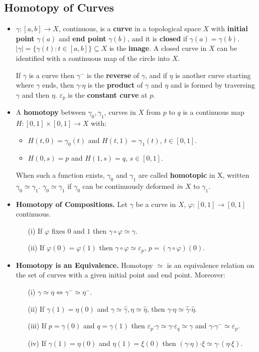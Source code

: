 \documentclass{article}
\newenvironment{topic}[1]{%
{\subsection{#1}}%
\begin{itemize}%
}{%
\end{itemize}%
}
\newcommand{\theorem}[1]{\item {\bf #1.}}
\newcommand{\lemma}[1]{\item {\bf #1.}}
\newcommand{\term}[1]{{\bf #1}}
\newcommand{\remark}{\item}
\newcommand{\curveproduct}{\boldsymbol{\cdot}}
\begin{document}
\begin{topic}{Homotopy of Curves}

\remark $\gamma : [a, b] \to X$, continuous, is a \term{curve} in a topological space $X$ with \term{initial point} $\gamma(a)$ and \term{end point} $\gamma(b)$, and it is \term{closed} if $\gamma(a) = \gamma(b)$. $|\gamma| = \{ \gamma(t) : t \in [a, b] \} \subseteq X$ is the \term{image}. A closed curve in $X$ can be identified with a continuous map of the circle into $X$.

If $\gamma$ is a curve then $\gamma^-$ is the \term{reverse} of $\gamma$, and if $\eta$ is another curve starting where $\gamma$ ends, then $\gamma \curveproduct \eta$ is the \term{product} of $\gamma$ and $\eta$ and is formed by traversing $\gamma$ and then $\eta$. $\varepsilon_p$ is the \term{constant curve} at $p$.

\remark A \term{homotopy} between $\gamma_0, \gamma_1$, curves in $X$ from $p$ to $q$ is a continuous map $H : [0, 1] \times [0, 1] \to X$ with:
\begin{itemize}
\item $H(t, 0) = \gamma_0(t)$ and $H(t, 1) = \gamma_1(t)$, $t \in [0, 1]$.
\item $H(0, s) = p$ and $H(1, s) = q$, $s \in [0, 1]$.
\end{itemize}
When such a function exists, $\gamma_0$ and $\gamma_1$ are called \term{homotopic} in X, written $\gamma_0 \simeq \gamma_1$. $\gamma_0 \simeq \gamma_1$ if $\gamma_0$ can be continuously deformed {\em in $X$} to $\gamma_1$.

\lemma{Homotopy of Compositions} Let $\gamma$ be a curve in $X$, $\varphi : [0, 1] \to [0, 1]$ continuous.
\begin{enumerate}
\item[(i)] If $\varphi$ fixes $0$ and $1$ then $\gamma \circ \varphi \simeq \gamma$.
\item[(ii)] If $\varphi(0) = \varphi(1)$ then $\gamma \circ \varphi \simeq \varepsilon_p$, $p = (\gamma \circ \varphi)(0)$.
\end{enumerate}

\theorem{Homotopy is an Equivalence} Homotopy $\simeq$ is an equivalence relation on the set of curves with a given initial point and end point. Moreover:
\begin{enumerate}
\item[(i)] $\gamma \simeq \eta \iff \gamma^- \simeq \eta^-$.
\item[(ii)] If $\gamma(1) = \eta(0)$ and $\gamma \simeq \hat\gamma, \eta \simeq \hat\eta$, then $\gamma \curveproduct \eta \simeq \hat\gamma \curveproduct \hat\eta$.
\item[(iii)] If $p = \gamma(0)$ and $q = \gamma(1)$ then $\varepsilon_p \curveproduct \gamma \simeq \gamma \curveproduct \varepsilon_q \simeq \gamma$ and $\gamma \curveproduct \gamma^- \simeq \varepsilon_p$.
\item[(iv)] If $\gamma(1) = \eta(0)$ and $\eta(1) = \xi(0)$ then $(\gamma \curveproduct \eta) \curveproduct \xi \simeq \gamma \curveproduct (\eta \curveproduct \xi)$.
\end{enumerate}


\end{topic}
\end{document}
